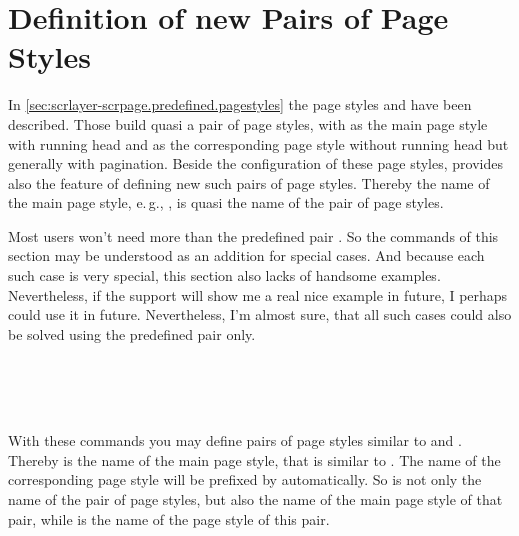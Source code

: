 \section{Definition of new Pairs of Page Styles}
\label{sec:scrlayer-scrpage.pagestyle.pairs}

In \autoref{sec:scrlayer-scrpage.predefined.pagestyles} the page styles
 and  have been
described. Those build quasi a pair of page styles, with
 as the main page style with running head and
 as the corresponding  page
style without running head but generally with pagination. Beside the
configuration of these page styles,  provides also
the feature of defining new such pairs of page styles. Thereby the name of the
main page style, e.\,g., , is quasi the name of the
pair of page styles.

Most users won't need more than the predefined pair
. So the commands of this section may be understood as
an addition for special cases. And because each such case is very special,
this section also lacks of handsome examples. Nevertheless, if the support
will show me a real nice example in future, I perhaps could use it in
future. Nevertheless, I'm almost sure, that all such cases could also be
solved using the predefined pair only.

\begin{Declaration}
  \\
  \\
  \\
\end{Declaration}
%
%
%
%
With these commands you may define pairs of page styles similar to
 and . Thereby
 is the name of the main page style, that is similar to
. The name of the corresponding  page
style will be prefixed by  automatically. So  is
not only the name of the pair of page styles, but also the name of the main
page style of that pair, while  is the name of the
 page style of this pair.

